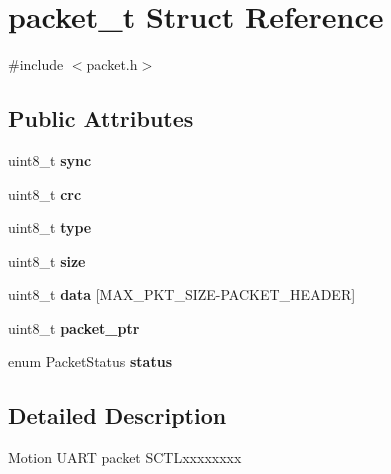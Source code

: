 \hypertarget{structpacket__t}{}\section{packet\+\_\+t Struct Reference}
\label{structpacket__t}


{\ttfamily \#include $<$packet.\+h$>$}

\subsection*{Public Attributes}
\begin{DoxyCompactItemize}
\item 
uint8\+\_\+t {\bfseries sync}\hypertarget{structpacket__t_a76553624e98cd50b114d0784abf2c7d5}{}\label{structpacket__t_a76553624e98cd50b114d0784abf2c7d5}

\item 
uint8\+\_\+t {\bfseries crc}\hypertarget{structpacket__t_a2d535881aafa6b7fe4bb93b6bf69989b}{}\label{structpacket__t_a2d535881aafa6b7fe4bb93b6bf69989b}

\item 
uint8\+\_\+t {\bfseries type}\hypertarget{structpacket__t_afa6fef69d5697c4e07fc8e582e2d578b}{}\label{structpacket__t_afa6fef69d5697c4e07fc8e582e2d578b}

\item 
uint8\+\_\+t {\bfseries size}\hypertarget{structpacket__t_accc302955ca1bc6f75c387b25001208e}{}\label{structpacket__t_accc302955ca1bc6f75c387b25001208e}

\item 
uint8\+\_\+t {\bfseries data} \mbox{[}M\+A\+X\+\_\+\+P\+K\+T\+\_\+\+S\+I\+ZE-\/P\+A\+C\+K\+E\+T\+\_\+\+H\+E\+A\+D\+ER\mbox{]}\hypertarget{structpacket__t_ad772e0b13e249e30cb343a9ffb769389}{}\label{structpacket__t_ad772e0b13e249e30cb343a9ffb769389}

\item 
uint8\+\_\+t {\bfseries packet\+\_\+ptr}\hypertarget{structpacket__t_a91a22b40a5047bfb9e02aa77b75a4279}{}\label{structpacket__t_a91a22b40a5047bfb9e02aa77b75a4279}

\item 
enum Packet\+Status {\bfseries status}\hypertarget{structpacket__t_a25fc56c4d2c72868ab500729ccfdc316}{}\label{structpacket__t_a25fc56c4d2c72868ab500729ccfdc316}

\end{DoxyCompactItemize}


\subsection{Detailed Description}
Motion U\+A\+RT packet S\+C\+T\+Lxxxxxxxx

